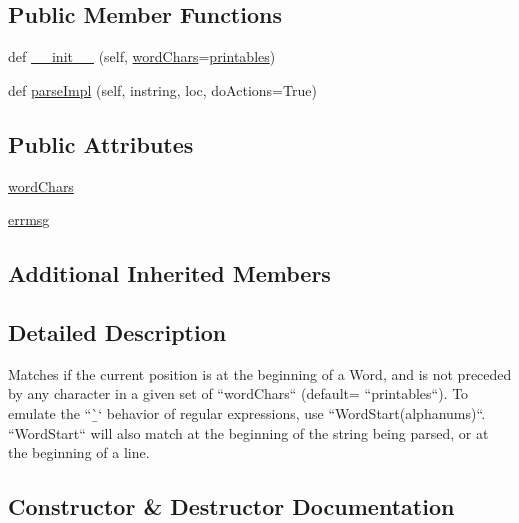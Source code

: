 \subsection*{Public Member Functions}
\begin{DoxyCompactItemize}
\item 
def \hyperlink{classpyparsing_1_1WordStart_a0c3845f11ba2d4c5c6fb3ad3701995c7}{\+\_\+\+\_\+init\+\_\+\+\_\+} (self, \hyperlink{classpyparsing_1_1WordStart_a0ea923f197bd62b93541fae61a15df4b}{word\+Chars}=\hyperlink{namespacepyparsing_ad8c4f09cc517099e759be4c94403f9b4}{printables})
\item 
def \hyperlink{classpyparsing_1_1WordStart_a15a97614c4b8c94f3e7e5fa776d12818}{parse\+Impl} (self, instring, loc, do\+Actions=True)
\end{DoxyCompactItemize}
\subsection*{Public Attributes}
\begin{DoxyCompactItemize}
\item 
\hyperlink{classpyparsing_1_1WordStart_a0ea923f197bd62b93541fae61a15df4b}{word\+Chars}
\item 
\hyperlink{classpyparsing_1_1WordStart_a1bb135bcea1c42bdebd0ec3d1418cc5a}{errmsg}
\end{DoxyCompactItemize}
\subsection*{Additional Inherited Members}


\subsection{Detailed Description}
\begin{DoxyVerb}Matches if the current position is at the beginning of a Word,
and is not preceded by any character in a given set of
``wordChars`` (default= ``printables``). To emulate the
``\b`` behavior of regular expressions, use
``WordStart(alphanums)``. ``WordStart`` will also match at
the beginning of the string being parsed, or at the beginning of
a line.
\end{DoxyVerb}
 

\subsection{Constructor \& Destructor Documentation}
\mbox{\label{classpyparsing_1_1WordStart_a0c3845f11ba2d4c5c6fb3ad3701995c7}} 
